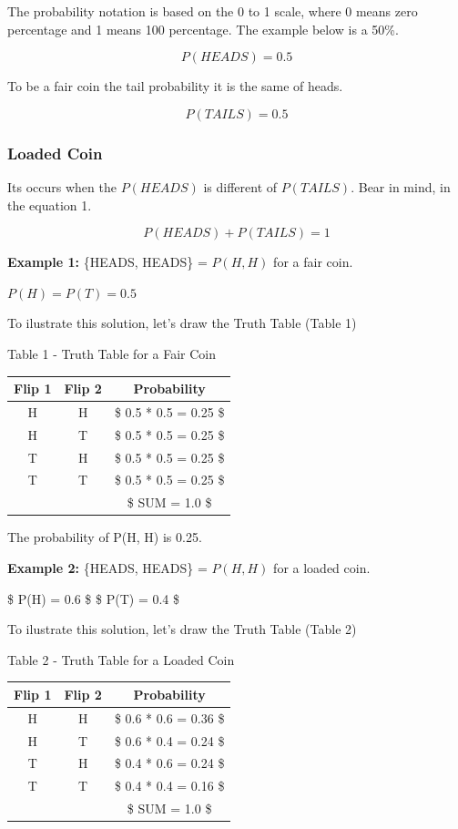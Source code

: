 \documentclass[]{book}
\begin{document}
The probability notation is based on the 0 to 1 scale, where 0 means
zero percentage and 1 means 100 percentage. The example below is a 50\%.

\[ P(HEADS) = 0.5 \]

To be a fair coin the tail probability it is the same of heads.

\[ P(TAILS) = 0.5 \]

\subsubsection{Loaded Coin}\label{loaded-coin}

Its occurs when the \(P(HEADS)\) is different of \(P(TAILS)\). Bear in
mind, in the equation 1.

\[ P(HEADS) + P(TAILS) = 1 \tag{1}\]

\textbf{Example 1:} \{HEADS, HEADS\} = \(P(H, H)\) for a fair coin.

\(P(H) = P(T) = 0.5\)

To ilustrate this solution, let's draw the Truth Table (Table 1)

Table 1 - Truth Table for a Fair Coin

\begin{longtable}[]{@{}ccc@{}}
\toprule
Flip 1 & Flip 2 & Probability\tabularnewline
\midrule
\endhead
H & H & \$ 0.5 * 0.5 = 0.25 \$\tabularnewline
H & T & \$ 0.5 * 0.5 = 0.25 \$\tabularnewline
T & H & \$ 0.5 * 0.5 = 0.25 \$\tabularnewline
T & T & \$ 0.5 * 0.5 = 0.25 \$\tabularnewline
& & \$ SUM = 1.0 \$\tabularnewline
\bottomrule
\end{longtable}

The probability of P(H, H) is 0.25.

\textbf{Example 2:} \{HEADS, HEADS\} = \(P(H, H)\) for a loaded coin.

\$ P(H) = 0.6 \$ \$ P(T) = 0.4 \$

To ilustrate this solution, let's draw the Truth Table (Table 2)

Table 2 - Truth Table for a Loaded Coin

\begin{longtable}[]{@{}ccc@{}}
\toprule
Flip 1 & Flip 2 & Probability\tabularnewline
\midrule
\endhead
H & H & \$ 0.6 * 0.6 = 0.36 \$\tabularnewline
H & T & \$ 0.6 * 0.4 = 0.24 \$\tabularnewline
T & H & \$ 0.4 * 0.6 = 0.24 \$\tabularnewline
T & T & \$ 0.4 * 0.4 = 0.16 \$\tabularnewline
& & \$ SUM = 1.0 \$\tabularnewline
\bottomrule
\end{longtable}
\end{document}
